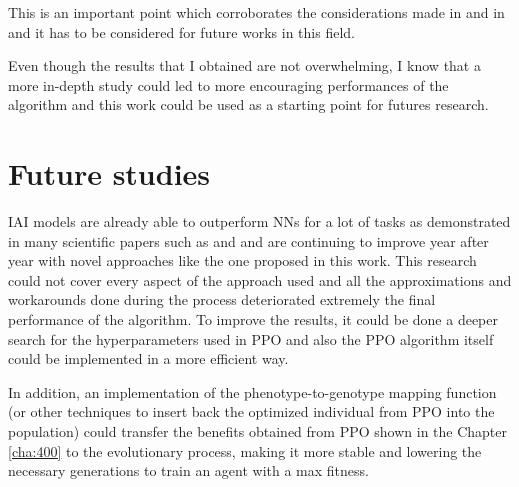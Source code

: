 This is an important point which corroborates the considerations made in \cite{ppo_acrobot} and in \cite{ppo_mountaincar} and it has to be considered for future works in this field.


Even though the results that I obtained are not overwhelming, I know that a more in-depth study could led to more encouraging performances of the algorithm and this work could be used as a starting point for futures research.


\section{Future studies}
\label{sec:520}
IAI models are already able to outperform NNs for a lot of tasks as demonstrated in many scientific papers such as \cite{custode} and \cite{silva} and are continuing to improve year after year with novel approaches like the one proposed in this work. This research could not cover every aspect of the approach used and all the approximations and workarounds done during the process deteriorated extremely the final performance of the algorithm. To improve the results, it could be done a deeper search for the hyperparameters used in PPO and also the PPO algorithm itself could be implemented in a more efficient way.

In addition, an implementation of the phenotype-to-genotype mapping function (or other techniques to insert back the optimized individual from PPO into the population) could transfer the benefits obtained from PPO shown in the Chapter \ref{cha:400} to the evolutionary process, making it more stable and lowering the necessary generations to train an agent with a max fitness.

\newpage